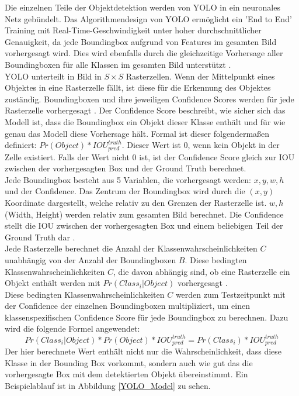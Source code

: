 {{	Die einzelnen Teile der Objektdetektion werden von YOLO in ein neuronales Netz gebündelt. Das Algorithmendesign von YOLO ermöglicht ein 'End to End' Training mit Real-Time-Geschwindigkeit unter hoher durchschnittlicher Genauigkeit, da jede Boundingbox aufgrund von Features im gesamten Bild vorhergesagt wird. Dies wird ebenfalls durch die gleichzeitige Vorhersage aller Boundingboxen für alle Klassen im gesamten Bild unterstützt \citep{Redmon2016}. \\
	YOLO unterteilt in Bild in $S \times S $ Rasterzellen. Wenn der Mittelpunkt eines Objektes in eine Rasterzelle fällt, ist diese für die Erkennung des Objektes zuständig. Boundingboxen und ihre jeweiligen Confidence Scores werden für jede Rasterzelle vorhergesagt \citep{Redmon2016}.
	Der Confidence Score beschreibt, wie sicher sich das Modell ist, dass die Boundingbox ein Objekt dieser Klasse enthält und für wie genau das Modell diese Vorhersage hält. Formal ist dieser folgendermaßen definiert:  $Pr (Object) * IOU^{truth}_{pred}$. Dieser Wert ist 0, wenn kein Objekt in der Zelle existiert. Falls der Wert nicht 0 ist, ist der Confidence Score gleich zur IOU zwischen der vorhergesagten Box und der Ground Truth berechnet. \\
	Jede Boundingbox besteht aus 5 Variablen, die vorhergesagt werden: $x, y, w, h$ und der Confidence. Das Zentrum der Boundingbox wird durch die $(x, y)$ Koordinate dargestellt, welche relativ zu den Grenzen der Rasterzelle ist. $w, h$ (Width, Height) werden relativ zum gesamten Bild berechnet. Die Confidence stellt die IOU zwischen der vorhergesagten Box und einem beliebigen Teil der Ground Truth dar \citep{Redmon2016}. \\
	Jede Rasterzelle berechnet die Anzahl der Klassenwahrscheinlichkeiten $C$ unabhängig von der Anzahl der Boundingboxen $B$. Diese bedingten Klassenwahrscheinlichkeiten $C$, die davon abhängig sind, ob eine Rasterzelle ein Objekt enthält werden mit $Pr(Class_i | Object)$ vorhergesagt \citep{Redmon2016}. \\
	Diese bedingten Klassenwahrscheinlichkeiten $C$ werden zum Testzeitpunkt mit der Confidence der einzelnen Boundingboxen multipliziert, um einen klassenspezifischen Confidence Score für jede Boundingbox zu berechnen. Dazu wird die folgende Formel angewendet: 
	\begin{equation}
	Pr(Class_i|Object) * Pr(Object) * IOU_{pred}^{truth} = Pr(Class_i) * IOU_{pred}^{truth}
	\end{equation}
	Der hier berechnete Wert enthält nicht nur die Wahrscheinlichkeit, dass diese Klasse in der Bounding Box vorkommt, sondern auch wie gut das die vorhergesagte Box mit dem detektierten Objekt übereinstimmt. Ein Beispielablauf ist in Abbildung \ref{YOLO_Model} zu sehen.
}}
